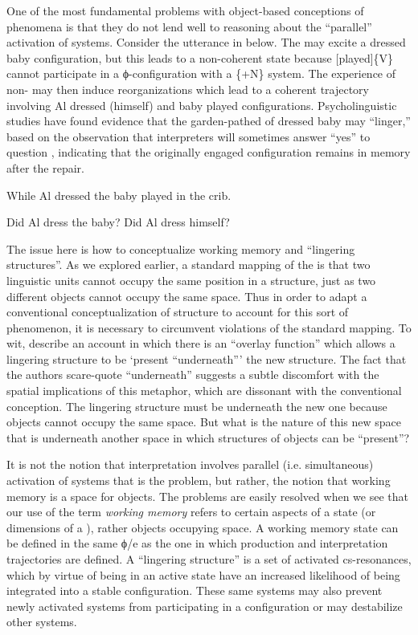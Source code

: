 One of the most fundamental problems with object-based conceptions of  phenomena is that they do not lend well to reasoning about the “parallel” activation of systems. Consider the  utterance in  below. The  may excite a {\textbar}dressed baby{\textbar} configuration, but this leads to a non-coherent state because [played]\{V\} cannot participate in a ϕ-con\-fi\-gu\-ra\-tion with a \{+N\} system. The experience of non- may then induce reorganizations which lead to a coherent trajectory involving {\textbar}Al dressed (himself){\textbar} and {\textbar}baby played{\textbar} configurations. Psycholinguistic studies have found evidence that the garden-pathed  of {\textbar}dressed baby{\textbar} may “linger,” based on the observation that interpreters will sometimes answer “yes” to question  \citep{SlatteryEtAl2013}, indicating that the originally engaged configuration remains in memory after the repair.

\ea\label{ex:6:1ter}
{While Al dressed the baby played in the crib.}
\z

\ea
\ea \label{ex:6:2tera} {Did Al dress the baby?}
\ex \label{ex:6:2terb }{Did Al dress himself?}
\z
\z

The issue here is how to conceptualize working memory and “lingering structures”. As we explored earlier, a standard mapping of the  is that two linguistic units cannot occupy the same position in a structure, just as two different objects cannot occupy the same space. Thus in order to adapt a conventional conceptualization of structure to account for this sort of phenomenon, it is necessary to circumvent violations of the standard mapping. To wit, \citet{SlatteryEtAl2013} describe an account in which there is an “overlay function” which allows a lingering structure to be ‘present “underneath”’ the new structure. The fact that the authors scare-quote “underneath” suggests a subtle discomfort with the spatial implications of this metaphor, which are dissonant with the conventional conception. The lingering structure must be underneath the new one because objects cannot occupy the same space. But what is the nature of this new space that is underneath another space in which structures of objects can be “present”?

It is not the notion that interpretation involves parallel (i.e. simultaneous) activation of systems that is the problem, but rather, the notion that working memory is a space for objects. The problems are easily resolved when we see that our use of the term \textit{working memory} refers to certain aspects of a state (or dimensions of a ), rather objects occupying space. A working memory state can be defined in the same ϕ/e  as the one in which production and interpretation trajectories are defined. A “lingering structure” is a set of activated cs-resonances, which by virtue of being in an active state have an increased likelihood of being integrated into a stable configuration. These same systems may also prevent newly activated systems from participating in a configuration or may destabilize other systems.

